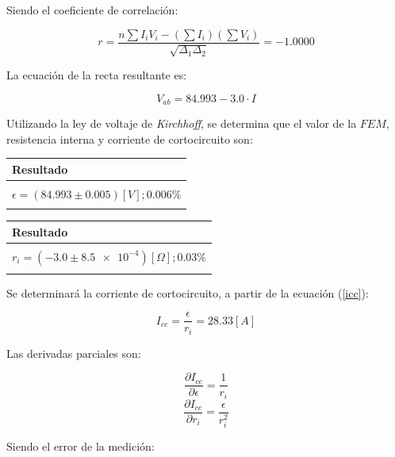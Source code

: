 \documentclass[letter,11pt]{article}
\begin{document}
Siendo el coeficiente de correlación:

\begin{equation*}
    r = \frac{n \sum I_i V_i - (\sum I_i)(\sum V_i)}{\sqrt{\Delta_1 \Delta_2}} = -1.0000
\end{equation*}

La ecuación de la recta resultante es:

\begin{equation*}
    V_{ab} = 84.993 - 3.0 \cdot I
\end{equation*}

Utilizando la ley de voltaje de \emph{Kirchhoff}, se determina que el valor de
la $FEM$, resistencia interna y corriente de cortocircuito son:

\begin{center}
\begin{tabular}{|>{\centering}m{11.0cm}<{\centering}|}
\hline
\textbf{Resultado}
\tabularnewline \hline
\\
$\epsilon = (84.993 \pm 0.005) [V]; 0.006 \%$ \tabularnewline
\\
\hline
\end{tabular}
\end{center}

\begin{center}
\begin{tabular}{|>{\centering}m{11.0cm}<{\centering}|}
\hline
\textbf{Resultado}
\tabularnewline \hline
\\
$r_i = (-3.0 \pm \num{8.5 e-4}) [\Omega]; 0.03 \%$ \tabularnewline
\\
\hline
\end{tabular}
\end{center}

Se determinará la corriente de cortocircuito, a partir de la ecuación 
(\ref{icc}):

\begin{equation*}
    I_{cc} = \frac{\epsilon}{r_i} = 28.33 [A]
\end{equation*}

Las derivadas parciales son:

\begin{equation*}
    \frac{\partial{I_{cc}}}{\partial{\epsilon}} = \frac{1}{r_i}
\end{equation*}
\begin{equation*}
    \frac{\partial{I_{cc}}}{\partial{r_i}} = \frac{\epsilon}{r_i^2}
\end{equation*}

Siendo el error de la medición:
\end{document}
